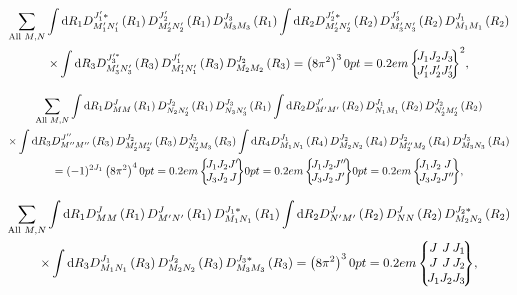 \begin{multline}
 \sum_{\text {All } M, N} 
 \int \dd R_{1} D_{M_{1}^{\prime} N_{1}^{\prime}}^{J_{1}^{\prime}*}\left(R_{1}\right) D_{M_{2}^{\prime} N_{2}^{\prime}}^{J_{2}^{\prime}}\left(R_{1}\right) D_{M_{3} M_{3}}^{J_{3}}\left(R_{1}\right) 
 \int \dd R_{2} D_{M_{2}^{\prime} N_{2}^{\prime}}^{J_{2}^{\prime} *}\left(R_{2}\right) D_{M_{3}^{\prime} N_{3}^{\prime}}^{J_{3}^{\prime}}\left(R_{2}\right) D_{M_{1} M_{1}}^{J_{1}}\left(R_{2}\right)
 \\
\times 
\int \dd R_{3} D_{M_{3}^{\prime} N_{3}^{\prime}}^{J_{3}^{\prime *}}\left(R_{3}\right) D_{M_{1}^{\prime} N_{1}^{\prime}}^{J_{1}^{\prime}}\left(R_{3}\right) D_{M_{2} M_{2}}^{J_{2}}\left(R_{3}\right)
=\left(8 \pi^{2}\right)^{3}
\sixj{J_1}{J_2}{J_3}{J_1^{\prime}}{J_2^{\prime}}{J_3^{\prime}}^2,  \label{eq:4:12:6}
\end{multline}

\begin{multline}
 \sum_{\text {All } M, N} 
 \int \dd R_{1} D_{M M}^{J}\left(R_{1}\right) D_{N_{2} N_{2}^{\prime}}^{J_{2}}\left(R_{1}\right) D_{N_{3} N_{3}^{\prime}}^{J_{3}}\left(R_{1}\right)
 \int \dd R_{2} D_{M^{\prime} M^{\prime}}^{J^{\prime}}\left(R_{2}\right) D_{N_{1} M_{1}}^{J_{1}}\left(R_{2}\right) D_{N_{2}^{\prime} M_{2}^{\prime}}^{J_{2}}\left(R_{2}\right)  
 \\
 \times 
 \int \dd R_{3} D_{M^{\prime \prime} M^{\prime \prime}}^{J^{\prime \prime}}\left(R_{3}\right) D_{M_{2}^{\prime} M_{2}^{\prime \prime}}^{J_{2}}\left(R_{3}\right) D_{N_{2}^{\prime} M_{3}}^{J_{3}}\left(R_{3}\right) 
 \int \dd R_{4} D_{M_{1} N_{1}}^{J_{1}}\left(R_{4}\right) D_{M_{2} N_{2}}^{J_{2}}\left(R_{4}\right) D_{M_{2}^{\prime \prime} M_{2}}^{J_{2}}\left(R_{4}\right) D_{M_{3} N_{3}}^{J_{3}}\left(R_{4}\right) \\
 =(-1)^{2 J_{1}}\left(8 \pi^{2}\right)^{4}
\sixj{J_1}{J_2}{J'}{J_3}{J_2}{J}
\sixj{J_{1}}{J_{2}}{J^{\prime \prime}}{J_{3}}{J_{2}}{J^{\prime}}
\sixj{J_{1}}{J_{2}}{J}{J_{3}}{J_{2}}{J^{\prime \prime}},  \label{eq:4:12:7}
\end{multline}

\begin{multline}
 \sum_{\text {All } M, N} \int \dd R_{1} D_{M M}^{J}\left(R_{1}\right) D_{M^{\prime} N^{\prime}}^{J}\left(R_{1}\right) D_{M_{1} N_{1}}^{J_{1} *}\left(R_{1}\right) \int \dd R_{2} D_{N^{\prime} M^{\prime}}^{J}\left(R_{2}\right) D_{N N}^{J}\left(R_{2}\right) D_{M_{2} N_{2}}^{J_{2} *}\left(R_{2}\right)  \\
 \times \int \dd R_{3} D_{M_{1} N_{1}}^{J_{1}}\left(R_{3}\right) D_{M_{2} N_{2}}^{J_{2}}\left(R_{3}\right) D_{M_{3} M_{3}}^{J_{3} *}\left(R_{3}\right)=\left(8 \pi^{2}\right)^{3}
 \ninej{J}{J}{J_{1}}{J}{J}{J_{2}}{J_{1}}{J_{2}}{J_{3}}
,  \label{eq:4:12:8}
\end{multline}


